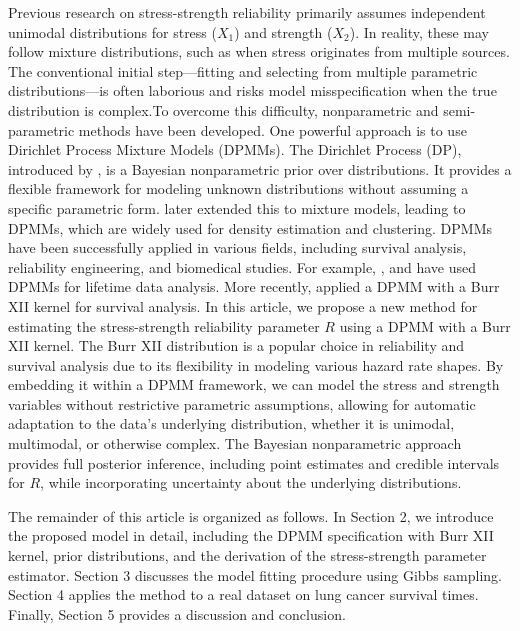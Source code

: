 \documentclass[twoside]{article}
\begin{document}
Previous research on stress-strength reliability primarily assumes independent unimodal distributions for stress ($X_1$) and strength ($X_2$). In reality, these may follow mixture distributions, such as when stress originates from multiple sources. The conventional initial step—fitting and selecting from multiple parametric distributions—is often laborious and risks model misspecification when the true distribution is complex.To overcome this difficulty, nonparametric and semi-parametric methods have been developed. One powerful approach is to use Dirichlet Process Mixture Models (DPMMs). The Dirichlet Process (DP), introduced by \cite{Ferguson:1973}, is a Bayesian nonparametric prior over distributions. It provides a flexible framework for modeling unknown distributions without assuming a specific parametric form. \cite{Antoniak:1974} later extended this to mixture models, leading to DPMMs, which are widely used for density estimation and clustering. 
DPMMs have been successfully applied in various fields, including survival analysis, reliability engineering, and biomedical studies. For example, \cite{Kottas:2006a},  and \cite{Hanson:2006} have used DPMMs for lifetime data analysis. More recently, \cite{HajiJoudaki:2022} applied a DPMM with a Burr XII kernel for survival analysis. 
In this article, we propose a new method for estimating the stress-strength reliability parameter \(R\) using a DPMM with a Burr XII kernel. The Burr XII distribution is a popular choice in reliability and survival analysis due to its flexibility in modeling various hazard rate shapes. By embedding it within a DPMM framework, we can model the stress and strength variables without restrictive parametric assumptions, allowing for automatic adaptation to the data's underlying distribution, whether it is unimodal, multimodal, or otherwise complex. The Bayesian nonparametric approach provides full posterior inference, including point estimates and credible intervals for \(R\), while incorporating uncertainty about the underlying distributions.

The remainder of this article is organized as follows. In Section 2, we introduce the proposed model in detail, including the DPMM specification with Burr XII kernel, prior distributions, and the derivation of the stress-strength parameter estimator. Section 3 discusses the model fitting procedure using Gibbs sampling.  Section 4 applies the method to a real dataset on lung cancer survival times. Finally, Section 5 provides a discussion and conclusion.
\end{document}
